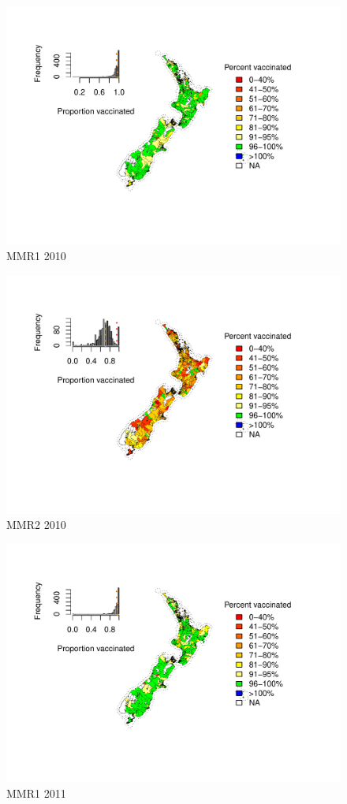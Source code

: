 \documentclass{article}
\begin{document}
\begin{figure}
    \centering
    \includegraphics[width=5.0in]{nir_census_MMR1_NIR_2010.pdf}
    \caption{MMR1 2010}
\end{figure}

\begin{figure}
    \centering
    \includegraphics[width=5.0in]{nir_census_MMR2_NIR_2010.pdf}
    \caption{MMR2 2010}
\end{figure}


\begin{figure}
    \centering
    \includegraphics[width=5.0in]{nir_census_MMR1_NIR_2011.pdf}
    \caption{MMR1 2011}
\end{figure}
\end{document}

